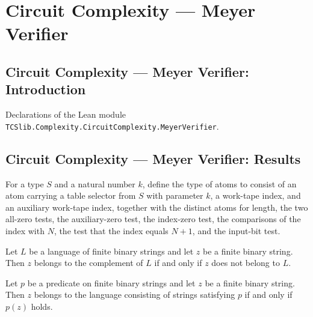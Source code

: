 \section{Circuit Complexity --- Meyer Verifier}
\subsection*{Circuit Complexity --- Meyer Verifier: Introduction}

Declarations of the Lean module \texttt{TCSlib.Complexity.CircuitComplexity.MeyerVerifier}.

\subsection*{Circuit Complexity --- Meyer Verifier: Results}

\begin{definition}
\label{Complexity.Meyer.Atom}
\leanok
{}
For a type $S$ and a natural number $k$, define the type of atoms to consist of an atom
carrying a table selector from $S$ with parameter $k$, a work-tape index, and an
auxiliary work-tape index, together with the distinct atoms for length, the two all-zero
tests, the auxiliary-zero test, the index-zero test, the comparisons of the index with
$N$, the test that the index equals $N+1$, and the input-bit test.
\end{definition}

\begin{theorem}
\label{Complexity.Meyer.lang_mem_compl}
\leanok
{}
Let $L$ be a language of finite binary strings and let $z$ be a finite binary string.
Then $z$ belongs to the complement of $L$ if and only if $z$ does not belong to $L$.
\end{theorem}

\begin{theorem}
\label{Complexity.Meyer.lang_mem_setOf}
\leanok
{}
Let $p$ be a predicate on finite binary strings and let $z$ be a finite binary string.
Then $z$ belongs to the language consisting of strings satisfying $p$ if and only if
$p(z)$ holds.
\end{theorem}

